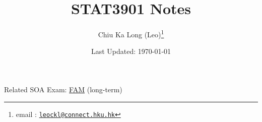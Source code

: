 \documentclass{article}
\begin{document}
\title{STAT3901 Notes}
\author{Chiu Ka Long (Leo)\thanks{email \faEnvelope:
\href{mailto:leockl@connect.hku.hk}{\texttt{leockl@connect.hku.hk}}}}
\date{Last Updated: \today}
\maketitle
\doclicenseThis
\begin{note}
Related SOA Exam:
\href{https://www.soa.org/education/exam-req/edu-exam-fam/}{FAM} (long-term)
\end{note}
\tableofcontents




\end{document}
